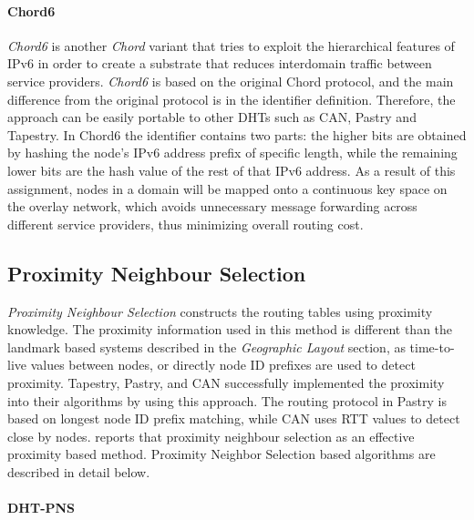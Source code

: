 \documentclass[acmcsur,acmnow]{acmtrans2m}
\begin{document}
\paragraph*{\bf Chord6}
\emph{Chord6} \cite{xiong_chord6_2005} is another \textit{Chord} variant that
tries to exploit the hierarchical features of IPv6 in order to create a
substrate that reduces interdomain traffic between service providers.
\textit{Chord6} is based on the original Chord protocol, and the main difference
from the original protocol is in the identifier definition. Therefore, the
approach can be easily portable to other DHTs such as CAN, Pastry and Tapestry.
In Chord6 the identifier contains two parts: the higher bits are obtained by
hashing the node's IPv6 address prefix of specific length, while the remaining
lower bits are the hash value of the rest of that IPv6 address. As a result of
this assignment, nodes in a domain will be mapped onto a continuous key space on
the overlay network, which avoids unnecessary message forwarding across
different service providers, thus minimizing overall routing cost. 


\subsection{Proximity Neighbour Selection}\label{sec:pns}
\textit{Proximity Neighbour Selection} constructs the routing tables using proximity
knowledge. The proximity information used in this method is different than the
landmark based systems described in the \textit{Geographic Layout} section, as time-to-live values between
nodes, or directly node ID prefixes are used to detect proximity.  Tapestry,
Pastry, and CAN successfully implemented the proximity into their algorithms by
using this approach.  The routing protocol in Pastry is based on longest node ID
prefix matching, while CAN uses RTT values to detect close by nodes.
\cite{castro_proximityp2p_2002}  reports that proximity neighbour selection as
an effective proximity based method.
%
Proximity Neighbor Selection based algorithms are described in detail below.


\paragraph*{\bf DHT-PNS}
\end{document}
